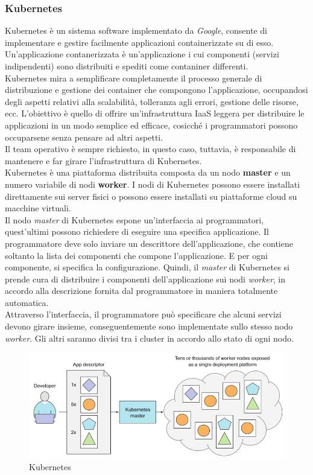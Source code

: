 \documentclass{article}
\begin{document}
\subsubsection{Kubernetes}
Kubernetes è un sistema software implementato da \textit{Google}, consente di implementare e gestire facilmente applicazioni containerizzate su di esso. \\ Un'applicazione contanerizzata è un'applicazione i cui componenti (servizi indipendenti) sono distribuiti e spediti come contaniner differenti. \\
Kubernetes mira a semplificare completamente il processo generale di distribuzione e gestione dei container che compongono l'applicazione, occupandosi degli aspetti relativi alla scalabilità, tolleranza agli errori, gestione delle risorse, ecc. L'obiettivo è quello di offrire un'infrastruttura IaaS leggera per distribuire le applicazioni in un modo semplice ed efficace, cosicché i programmatori possono occuparsene senza pensare ad altri aspetti. \\ 
Il team operativo è sempre richiesto, in questo caso, tuttavia, è responsabile di mantenere e far girare l'infrastruttura di Kubernetes. \\
Kubernetes è una piattaforma distribuita composta da un nodo \textbf{master} e un numero variabile di nodi \textbf{worker}. I nodi di Kubernetes possono essere installati direttamente sui server fisici o possono essere installati su piattaforme cloud su macchine virtuali. \\
Il nodo \textit{master} di Kubernetes espone un'interfaccia ai programmatori, quest'ultimi possono richiedere di eseguire una specifica applicazione. Il programmatore deve solo inviare un descrittore dell'applicazione, che contiene soltanto la lista dei componenti che compone l'applicazione. E per ogni componente, si specifica la configurazione. Quindi, il \textit{master} di Kubernetes si prende cura di distribuire i componenti dell'applicazione sui nodi \textit{worker}, in accordo alla descrizione fornita dal programmatore in maniera totalmente automatica. \\
Attraverso l'interfaccia, il programmatore può specificare che alcuni servizi devono girare insieme, conseguentemente sono implementate sullo stesso nodo \textit{worker}. Gli altri saranno divisi tra i cluster in accordo allo stato di ogni nodo. 
\begin{figure}[H]
    \centering
    \includegraphics[scale=0.4]{img/kubernetes.png}
    \caption{Kubernetes}
\end{figure}\noindent
\end{document}
